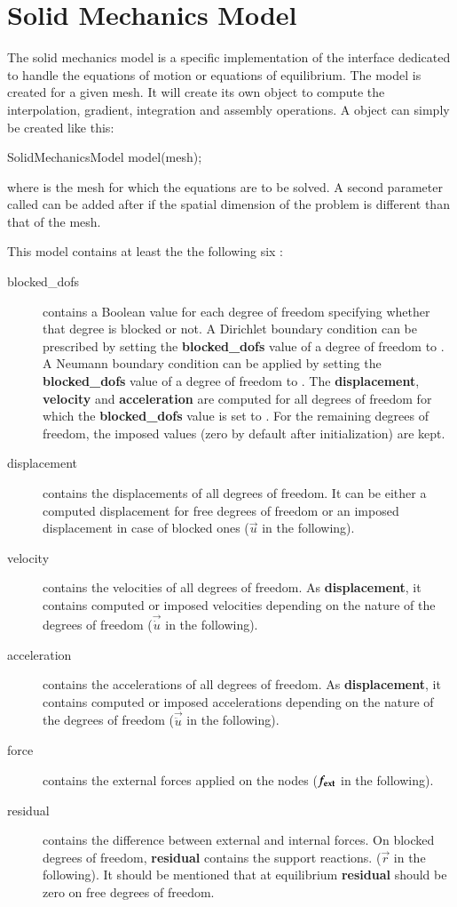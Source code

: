 \chapter{Solid Mechanics Model\label{sect:smm}}

The solid mechanics model is a specific implementation of the
 interface dedicated to handle the equations of motion or
equations of equilibrium. The model is created for a given mesh.  It
will create its own  object to compute the interpolation,
gradient, integration and assembly operations.  A
 object can simply be created like this:
\begin{cpp}
  SolidMechanicsModel model(mesh);
\end{cpp}
where  is the mesh for which the equations are to be
solved. A second parameter called  can be
added after  if the spatial dimension of the problem is
different than that of the mesh.

This model contains at least the the following six :
\begin{description}
\item[blocked\_dofs] contains a Boolean value for each degree of
  freedom specifying whether that degree is blocked or not. A
  Dirichlet boundary condition can be prescribed by setting the
  \textbf{blocked\_dofs} value of a degree of freedom to .
  A Neumann boundary condition can be applied by setting the
  \textbf{blocked\_dofs} value of a degree of freedom to .
  The \textbf{displacement}, \textbf{velocity} and
  \textbf{acceleration} are computed for all degrees of freedom for
  which the \textbf{blocked\_dofs} value is set to . For
  the remaining degrees of freedom, the imposed values (zero by
  default after initialization) are kept.
\item[displacement] contains the displacements of all degrees of
  freedom. It can be either a computed displacement for free degrees
  of freedom or an imposed displacement in case of blocked ones
  ($\vec{u}$ in the following).
\item[velocity] contains the velocities of all degrees of freedom.  As
  \textbf{displacement}, it contains computed or imposed velocities
  depending on the nature of the degrees of freedom ($\vec{\dot{u}}$
  in the following).
\item[acceleration] contains the accelerations of all degrees of
  freedom. As \textbf{displacement}, it contains computed or imposed
  accelerations depending on the nature of the degrees of freedom
  ($\vec{\ddot{u}}$ in the following).
\item[force] contains the external forces applied on the nodes
  ($\boldsymbol{f_{{\mathrm{ext}}}}$ in the following).
\item[residual] contains the difference between external and internal
  forces. On blocked degrees of freedom, \textbf{residual} contains
  the support reactions.  ($\vec{r}$ in the following).  It should be
  mentioned that at equilibrium \textbf{residual} should be zero on
  free degrees of freedom.
\end{description}

